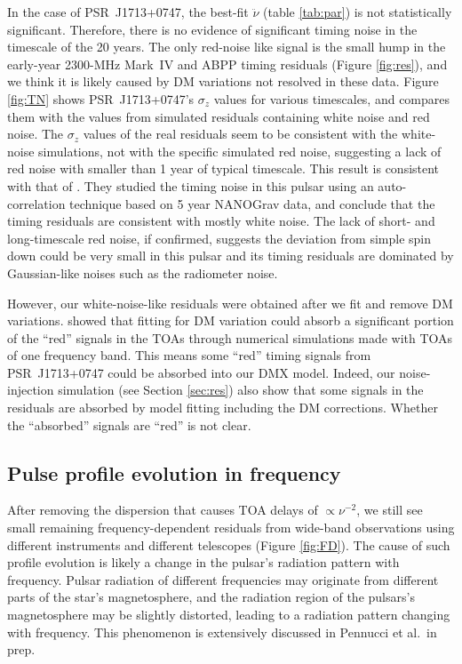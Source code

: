 In the case of PSR~J1713+0747, the
best-fit $\ddot{\nu}$ (table \ref{tab:par}) is not statistically significant. 
Therefore, there is no evidence of significant timing noise in the
timescale of the 20 years. The only red-noise like
signal is the small hump in the early-year 2300-MHz Mark~IV and ABPP timing residuals (Figure
\ref{fig:res}), and we think it is likely caused by DM variations not resolved in
these data. Figure \ref{fig:TN} 
shows PSR~J1713+0747's $\sigma_z$ values for various timescales, and compares them
with the values from simulated residuals containing white noise and
red noise. The $\sigma_z$ values of the real residuals seem to be consistent 
with the white-noise simulations, not with the specific simulated red noise,
suggesting a lack of red noise with smaller than 1 year of typical timescale. 
This result is consistent with that of \citet{pjl+13}. They
studied the timing noise in this pulsar using an auto-correlation technique
based on 5 year NANOGrav data, and conclude that the timing residuals are
consistent with mostly white noise.
The lack of short- and long-timescale red noise, if confirmed,  suggests the
deviation from simple spin down could be very small in this pulsar and its timing
residuals are dominated by Gaussian-like noises such as the radiometer noise.

However, our white-noise-like residuals were obtained after we fit and remove
DM variations. \citet{kcs+13} showed that fitting for DM variation could
absorb a significant portion of the ``red'' signals in the TOAs through
numerical simulations made with TOAs of one frequency band. This means
some ``red'' timing signals from PSR~J1713+0747 could be absorbed into 
our DMX model. Indeed, our noise-injection simulation (see Section
\ref{sec:res})
also show that some signals in the residuals are absorbed by model fitting
including the DM corrections.
Whether the ``absorbed'' signals are ``red'' is not clear.


\subsection{Pulse profile evolution in frequency}
\label{sec:FD}
After removing the dispersion that causes TOA delays of $\propto \nu^{-2}$,
 we still see small remaining frequency-dependent residuals from wide-band
observations using
different instruments and different telescopes (Figure \ref{fig:FD}).  
The cause of such profile evolution is likely a change in the pulsar's
radiation pattern with frequency.  Pulsar radiation of different frequencies may originate from
different parts of the star's magnetosphere, and 
the radiation region of the pulsars's magnetosphere may be slightly distorted,
leading to a radiation pattern changing with frequency. This phenomenon is extensively discussed in Pennucci et al.\ in prep.

